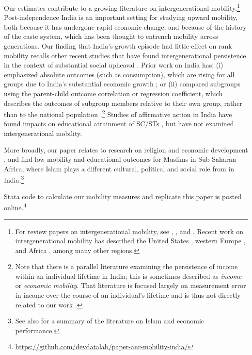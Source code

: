 \documentclass[12pt,letterpaper]{article}
\numberwithin{equation}{section}
\begin{document}
Our estimates contribute to a growing literature on intergenerational mobility.\footnote{For review papers on intergenerational mobility, see , , and . Recent work on intergenerational mobility has described the United States \cite{chetty2014b,chetty2014c,chetty2018}, western Europe \cite{bratberg2017}, and Africa \cite{alesina2018}, among many other regions.} Post-independence India is an important setting for studying upward mobility, both because it has undergone rapid economic change, and because of the history of the caste system, which has been thought to entrench mobility across generations. Our finding that India's growth episode had little effect on rank mobility recalls other recent studies that have found intergenerational persistence in the context of substantial social upheaval \cite{ager2021,alesina2020b}. Prior work on India has: (i) emphasized absolute outcomes (such as consumption), which are rising for all groups due to India's substantial economic growth \cite{maitra2009,hnatkovska2013}; or (ii) compared subgroups using the parent-child outcome correlation or regression coefficient, which describes the outcomes of subgroup members relative to their own group, rather than to the national population \cite{hnatkovska2013,emran2015,azam2015}.\footnote{Note that there is a parallel literature examining the persistence of income within an individual lifetime in India; this is sometimes described as \textit{income} or \textit{economic mobility}. That literature is focused largely on measurement error in income over the course of an individual's lifetime and is thus not directly related to our work \cite{azam2016,li2019}.} Studies of affirmative action in India have found impacts on educational attainment of SC/STs \cite{frisancho2012,bagde2016,cassan2017,khanna2020}, but have not examined intergenerational mobility.

More broadly, our paper relates to research on religion and economic development  \cite{mccleary2006,becker2009}.  and  find low mobility and educational outcomes for Muslims in Sub-Saharan Africa, where Islam plays a different cultural, political and social role from in India.\footnote{See also  for a summary of the literature on Islam and economic performance.}

Stata code to calculate our mobility measures and replicate this paper is posted online.\footnote{\url{https://github.com/devdatalab/paper-anr-mobility-india/}} 
\end{document}
